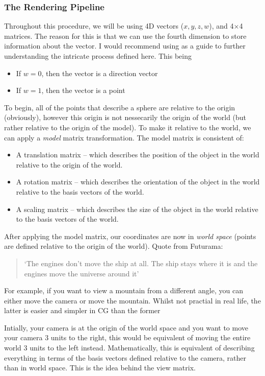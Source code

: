 \documentclass[main.tex]{subfiles}
\begin{document}
\subsubsection*{The Rendering Pipeline}
Throughout this procedure, we will be using 4D vectors ($x, y, z, w$), and 4$\times$4 matrices. The reason for this is that we can use the fourth dimension to store information
about the vector. I would recommend using \cite{EssenceLinearAlgebra} as a guide to further understanding the intricate process defined here. This being
\begin{itemize}
    \item If $w = 0$, then the vector is a direction vector
    \item If $w = 1$, then the vector is a point
\end{itemize}
To begin, all of the points that describe a sphere are relative to the origin (obviously), however this origin is not nessecarily the origin
of the world (but rather relative to the origin of the model). To make it relative to the world, we can apply a \textit{model} matrix transformation.
The model matrix is consistent of:
\begin{itemize}
    \item A translation matrix -- which describes the position of the object in the world relative to the origin of the world.
    \item A rotation matrix -- which describes the orientation of the object in the world relative to the basis vectors of the world.
    \item A scaling matrix -- which describes the size of the object in the world relative to the basis vectors of the world.
\end{itemize}
After applying the model matrix, our coordinates are now in \textit{world space} (points are defined relative to the origin of the world).
Quote from Futurama:
\begin{quote}
    `The engines don't move the ship at all. The ship stays where it is and the engines move the universe around it'
\end{quote}
For example, if you want to view a mountain from a different angle, you can either move the camera or move the mountain.
Whilst not practial in real life, the latter is easier and simpler in CG than the former\@

Intially, your camera is at the origin of the world space and
you want to move your camera 3 units to the right, this would be equivalent of moving the entire world 3 units to the left instead.
Mathematically, this is equivalent of describing everything in terms of the basis vectors defined relative to the camera,
rather than in world space. This is the idea behind the view matrix.
\end{document}
